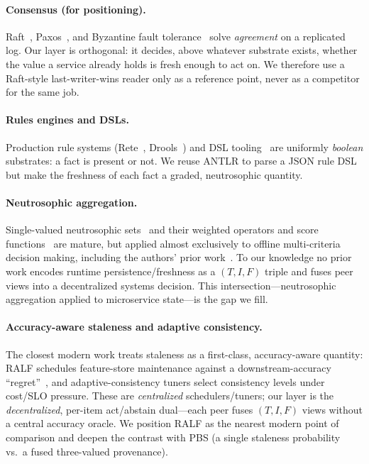 \documentclass[11pt]{article}
\begin{document}
\paragraph{Consensus (for positioning).} Raft~\cite{ongaro2014raft}, Paxos~\cite{lamport1998paxos},
and Byzantine fault tolerance~\cite{castro2002pbft} solve \emph{agreement} on a replicated log. Our
layer is orthogonal: it decides, above whatever substrate exists, whether the value a service already
holds is fresh enough to act on. We therefore use a Raft-style last-writer-wins reader only as a
reference point, never as a competitor for the same job.

\paragraph{Rules engines and DSLs.} Production rule systems (Rete~\cite{forgy1982rete},
Drools~\cite{proctor2012drools}) and DSL tooling~\cite{mernik2005dsl,parr2013antlr} are uniformly
\emph{boolean} substrates: a fact is present or not. We reuse ANTLR to parse a JSON rule DSL but make
the freshness of each fact a graded, neutrosophic quantity.

\paragraph{Neutrosophic aggregation.} Single-valued neutrosophic sets~\cite{wang2010svns,smarandache1999unifying}
and their weighted operators and score functions~\cite{ye2014score,jana2019robust,elghareeb2019package}
are mature, but applied almost exclusively to offline multi-criteria decision making, including the
authors' prior work~\cite{nabeeh2019topsis}. To our knowledge no prior work encodes runtime
persistence/freshness as a $(T,I,F)$ triple and fuses peer views into a decentralized systems
decision. This intersection---neutrosophic aggregation applied to microservice state---is the gap we
fill.

\paragraph{Accuracy-aware staleness and adaptive consistency.} The closest modern work treats
staleness as a first-class, accuracy-aware quantity: RALF schedules feature-store maintenance against
a downstream-accuracy ``regret''~\cite{wooders2024ralf}, and adaptive-consistency tuners select
consistency levels under cost/SLO pressure. These are \emph{centralized} schedulers/tuners; our layer
is the \emph{decentralized}, per-item act/abstain dual---each peer fuses $(T,I,F)$ views without a
central accuracy oracle. We position RALF as the nearest modern point of comparison and deepen the
contrast with PBS (a single staleness probability vs.\ a fused three-valued provenance).
\end{document}
